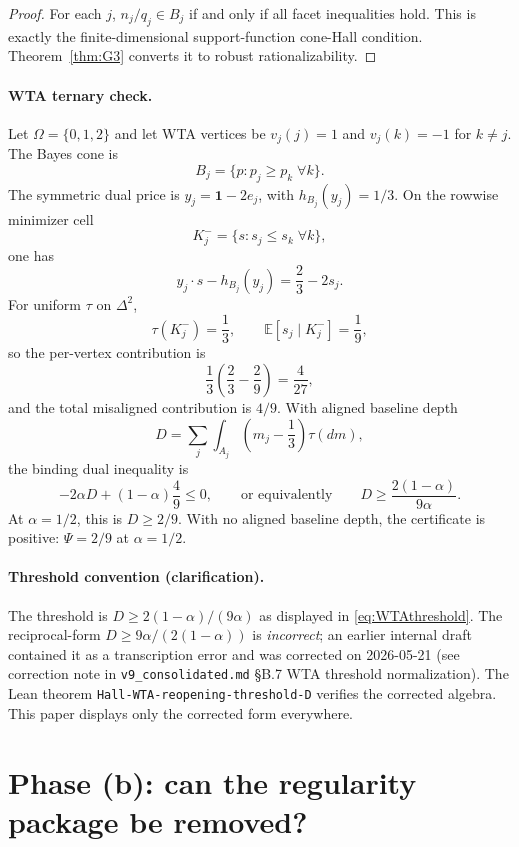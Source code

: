 \documentclass[11pt]{article}
\theoremstyle{definition}
\theoremstyle{remark}
\newcommand{\Om}{\Omega}
\newcommand{\E}{\mathbb{E}}
\begin{document}
\begin{proof}
For each $j$, $n_j/q_j\in B_j$ if and only if all facet inequalities hold. This is exactly the finite-dimensional support-function cone-Hall condition. Theorem~\ref{thm:G3} converts it to robust rationalizability.
\end{proof}

\paragraph{WTA ternary check.} Let $\Om=\{0,1,2\}$ and let WTA vertices be $v_j(j)=1$ and $v_j(k)=-1$ for $k\ne j$. The Bayes cone is
\[
  B_j=\{p:p_j\ge p_k\;\forall k\}.
\]
The symmetric dual price is $y_j=\mathbf{1}-2e_j$, with $h_{B_j}(y_j)=1/3$. On the rowwise minimizer cell
\[
  K_j^- = \{s:s_j\le s_k\;\forall k\},
\]
one has
\[
  y_j\cdot s-h_{B_j}(y_j)=\frac23-2s_j.
\]
For uniform $\tau$ on $\Delta^2$,
\[
  \tau(K_j^-)=\frac13,
  \qquad
  \E[s_j\mid K_j^-]=\frac19,
\]
so the per-vertex contribution is
\[
  \frac13\left(\frac23-\frac29\right)=\frac4{27},
\]
and the total misaligned contribution is $4/9$. With aligned baseline depth
\[
  D=\sum_j\int_{A_j}\left(m_j-\frac13\right)\tau(dm),
\]
the binding dual inequality is
\begin{equation}\label{eq:WTAthreshold}
  -2\alpha D+(1-\alpha)\frac49\le0,
  \qquad\text{or equivalently}\qquad
  D\ge \frac{2(1-\alpha)}{9\alpha}.
\end{equation}
At $\alpha=1/2$, this is $D\ge2/9$. With no aligned baseline depth, the certificate is positive: $\Psi=2/9$ at $\alpha=1/2$.

\paragraph{Threshold convention (clarification).} The threshold is $D\ge2(1-\alpha)/(9\alpha)$ as displayed in \eqref{eq:WTAthreshold}. The reciprocal-form $D\ge9\alpha/(2(1-\alpha))$ is \emph{incorrect}; an earlier internal draft contained it as a transcription error and was corrected on 2026-05-21 (see correction note in \texttt{v9\_consolidated.md} \S B.7 WTA threshold normalization). The Lean theorem \texttt{Hall-WTA-reopening-threshold-D} verifies the corrected algebra. This paper displays only the corrected form everywhere.

\section{Phase (b): can the regularity package be removed?}\label{sec:phaseb}
\end{document}
